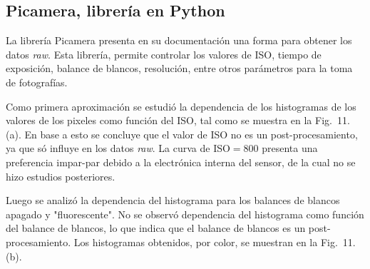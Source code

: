 \documentclass[twoside,twocolumn]{article}
\begin{document}
  \subsection*{Picamera, librería en Python}%
    La librería Picamera presenta en su documentación una forma para obtener los datos \emph{raw}\cite{picamera}.
    Esta librería, permite controlar los valores de ISO, tiempo de exposición,
    balance de blancos, resolución, entre otros parámetros para la toma de fotografías.

    Como primera aproximación se estudió la dependencia de los histogramas de los valores de los pixeles
    como función del ISO, tal como se muestra en la Fig.~11.(a).
    En base a esto se concluye que el valor de ISO no es un post-procesamiento, ya que só influye en los datos \emph{raw}.
    La curva de ISO$=800$ presenta una preferencia impar-par debido a la electrónica interna del sensor,
    de la cual no se hizo estudios posteriores.

    Luego se analizó la dependencia del histograma para los balances de blancos apagado y "fluorescente".
    No se observó dependencia del histograma como función del balance de blancos,
    lo que indica que el balance de blancos es un post-procesamiento.
    Los histogramas obtenidos, por color, se muestran en la Fig.~11.(b).
\end{document}

